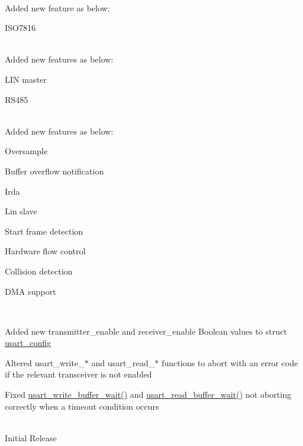 \begin{TabularC}{1}
\hline
{}\\
Added new feature as below\+: \begin{DoxyItemize}
\item I\+S\+O7816  \end{DoxyItemize}
\\
Added new features as below\+: \begin{DoxyItemize}
\item L\+I\+N master \item R\+S485  \end{DoxyItemize}
\\
Added new features as below\+: \begin{DoxyItemize}
\item Oversample \item Buffer overflow notification \item Irda \item Lin slave \item Start frame detection \item Hardware flow control \item Collision detection \item D\+M\+A support   \end{DoxyItemize}
\\
\begin{DoxyItemize}
\item Added new {\ttfamily transmitter\+\_\+enable} and {\ttfamily receiver\+\_\+enable} Boolean values to {\ttfamily struct} \hyperlink{structusart__config}{usart\+\_\+config} \item Altered {\ttfamily usart\+\_\+write\+\_\+$\ast$} and usart\+\_\+read\+\_\+$\ast$ functions to abort with an error code if the relevant transceiver is not enabled \item Fixed {\ttfamily \hyperlink{group__asfdoc__sam0__sercom__usart__group_gacffd0845249348d37d14c65a41132e41}{usart\+\_\+write\+\_\+buffer\+\_\+wait()}} and {\ttfamily \hyperlink{group__asfdoc__sam0__sercom__usart__group_ga4f788b3478e9c1fa8f0dd8d09939d3a6}{usart\+\_\+read\+\_\+buffer\+\_\+wait()}} not aborting correctly when a timeout condition occurs  \end{DoxyItemize}
\\
Initial Release  \\
\end{TabularC}
